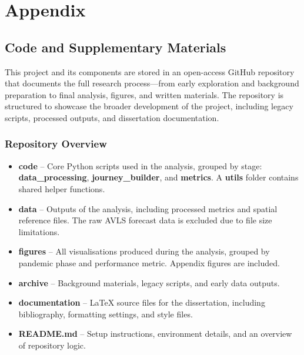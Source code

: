 \appendix
\section*{Appendix}

\subsection*{Code and Supplementary Materials}

This project and its components are stored in an open-access GitHub repository that documents the full research process—from early exploration and background preparation to final analysis, figures, and written materials. The repository is structured to showcase the broader development of the project, including legacy scripts, processed outputs, and dissertation documentation.

\vspace{1em}
\subsubsection*{Repository Overview}

\begin{itemize}
  \item \textbf{code} – Core Python scripts used in the analysis, grouped by stage: \textbf{data\_processing}, \textbf{journey\_builder}, and \textbf{metrics}. A \textbf{utils} folder contains shared helper functions.

  \item \textbf{data} – Outputs of the analysis, including processed metrics and spatial reference files. The raw AVLS forecast data is excluded due to file size limitations.

  \item \textbf{figures} – All visualisations produced during the analysis, grouped by pandemic phase and performance metric. Appendix figures are included.

  \item \textbf{archive} – Background materials, legacy scripts, and early data outputs.

  \item \textbf{documentation} – LaTeX source files for the dissertation, including bibliography, formatting settings, and style files.

  \item \textbf{README.md} – Setup instructions, environment details, and an overview of repository logic.
\end{itemize}

